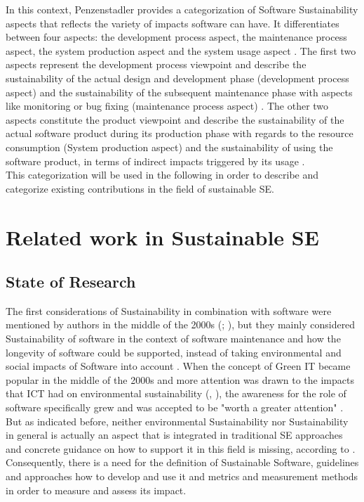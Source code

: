 \documentclass[oribibl]{llncs}
\begin{document}
In this context, Penzenstadler \cite{penzenstadler_supporting_2012} provides a categorization of Software Sustainability aspects that reflects the variety of impacts software can have. It differentiates between four aspects: the development process aspect, the maintenance process aspect, the system production aspect and the system usage aspect \cite{penzenstadler_supporting_2012}. The first two aspects represent the development process viewpoint and describe the sustainability of the actual design and development phase (development process aspect) and the sustainability of the subsequent maintenance phase with aspects like monitoring or bug fixing (maintenance process aspect) \cite{penzenstadler_sustainability_2012}. The other two aspects constitute the product viewpoint and describe the sustainability of the actual software product during its production phase with regards to the resource consumption (System production aspect) and the sustainability of using the software product, in terms of indirect impacts triggered by its usage \cite{penzenstadler_sustainability_2012}.\\ %
This categorization will be used in the following in order to describe and categorize existing contributions in the field of sustainable SE.


\section{Related work in Sustainable SE} 
\subsection{State of Research\label{stateOfResearch}} The first considerations of Sustainability in combination with software were mentioned by authors in the middle of the 2000s (\cite{seacord_measuring_2003}; \cite{tate_sustainable_2005}), but they mainly considered Sustainability of software in the context of software maintenance and how the longevity of software could be supported, instead of taking environmental and social impacts of Software into account \cite{albertao_measuring_2010}. When the concept of Green IT became popular in the middle of the 2000s and more attention was drawn to the impacts that ICT had on environmental sustainability (\cite{berkhout_impacts_2001}, \cite{hilty_relevance_2006}), the awareness for the role of software specifically grew and was accepted to be "worth a greater attention" \cite[p.\,1]{capra_green_2009}. But as indicated before, neither environmental Sustainability nor Sustainability in general is actually an aspect that is integrated in traditional SE approaches and concrete guidance on how to support it in this field is missing, according to \cite{penzenstadler_supporting_2012}. Consequently, there is a need for the definition of Sustainable Software, guidelines and approaches how to develop and use it and metrics and measurement methods in order to measure and assess its impact.
\end{document}

